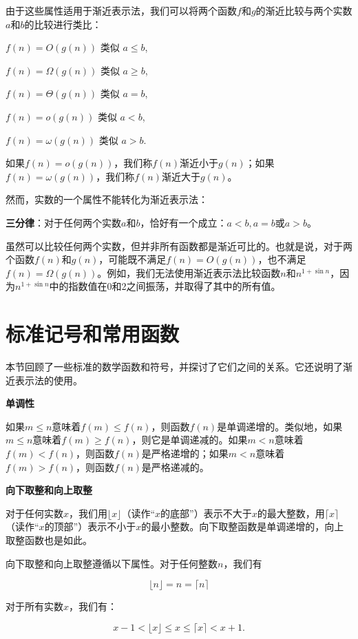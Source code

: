 \documentclass[lang=cn,newtx,10pt,scheme=chinese]{elegantbook}
\begin{document}
由于这些属性适用于渐近表示法，我们可以将两个函数$f$和$g$的渐近比较与两个实数$a$和$b$的比较进行类比：

$f(n)=O(g(n))$ 类似 $a \leq b$,

$f(n)=\Omega(g(n))$ 类似 $a \geq b$,

$f(n)=\Theta(g(n))$ 类似 $a=b$,

$f(n)=o(g(n))$ 类似 $a<b$,

$f(n)=\omega(g(n))$ 类似 $a>b$.

如果$f(n)=o(g(n))$，我们称$f(n)$渐近小于$g(n)$；如果$f(n)=\omega(g(n))$，我们称$f(n)$渐近大于$g(n)$。

然而，实数的一个属性不能转化为渐近表示法：

\textbf{三分律}：对于任何两个实数$a$和$b$，恰好有一个成立：$a<b, a=b$或$a>b$。

虽然可以比较任何两个实数，但并非所有函数都是渐近可比的。也就是说，对于两个函数$f(n)$和$g(n)$，可能既不满足$f(n)=O(g(n))$，也不满足$f(n)=\Omega(g(n))$。例如，我们无法使用渐近表示法比较函数$n$和$n^{1+\sin n}$，因为$n^{1+\sin n}$中的指数值在0和2之间振荡，并取得了其中的所有值。

\section{标准记号和常用函数}\label{section-3.3}

本节回顾了一些标准的数学函数和符号，并探讨了它们之间的关系。它还说明了渐近表示法的使用。

\textbf{单调性}

如果$m\leq n$意味着$f(m)\leq f(n)$，则函数$f(n)$是单调递增的。类似地，如果$m\leq n$意味着$f(m)\geq f(n)$，则它是单调递减的。如果$m<n$意味着$f(m)<f(n)$，则函数$f(n)$是严格递增的；如果$m<n$意味着$f(m)>f(n)$，则函数$f(n)$是严格递减的。

\textbf{向下取整和向上取整}

对于任何实数$x$，我们用$\lfloor x\rfloor$（读作“$x$的底部”）表示不大于$x$的最大整数，用$\lceil x\rceil$（读作“$x$的顶部”）表示不小于$x$的最小整数。向下取整函数是单调递增的，向上取整函数也是如此。

向下取整和向上取整遵循以下属性。对于任何整数$n$，我们有

\begin{equation}\label{eq:3.1}
\lfloor n\rfloor=n=\lceil n\rceil
\end{equation}

对于所有实数$x$，我们有：

\begin{equation}\label{eq:3.2}
x-1<\lfloor x\rfloor \leq x \leq\lceil x\rceil<x+1 .
\end{equation}
\end{document}
